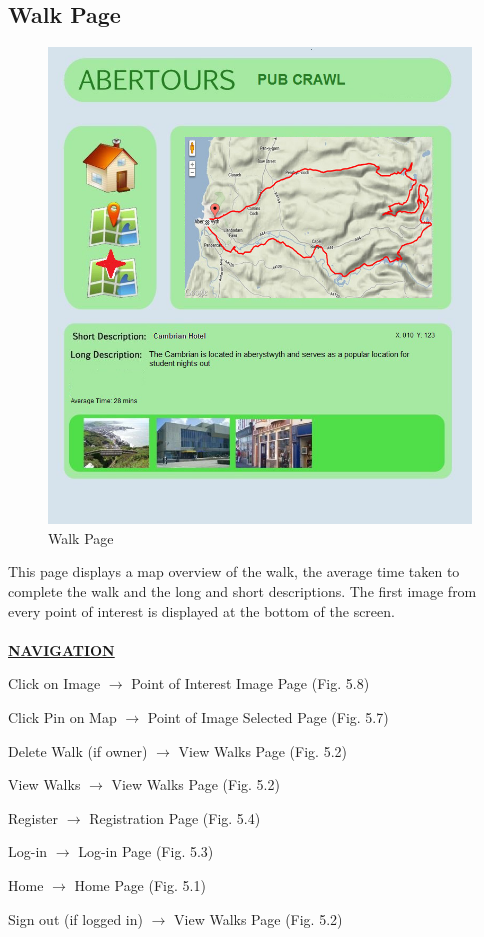 \documentclass[12pt]{article}
\begin{document}
\subsection{Walk Page}
\begin{figure}[htp]
\centering
\includegraphics[scale=0.50]{Project_Plan/Web/poi_selected_page_01_copy.jpg}
\caption{Walk Page }
\label{Walk Page}
\end{figure}
\par{This page displays a map overview of the walk, the average time taken to complete the walk and the long and short descriptions. The first image from every point of interest is displayed at the bottom of the screen. \\ \\}
\textbf{\uline{NAVIGATION}}
\par{Click on Image $\rightarrow$ Point of Interest Image Page (Fig. 5.8)}
\par{Click Pin on Map $\rightarrow$ Point of Image Selected Page (Fig. 5.7)}
\par{Delete Walk (if owner) $\rightarrow$ View Walks Page (Fig. 5.2)}
\par{View Walks $\rightarrow$ View Walks Page (Fig. 5.2)}
\par{Register $\rightarrow$ Registration Page (Fig. 5.4)}
\par{Log-in $\rightarrow$ Log-in Page (Fig. 5.3)}
\par{Home $\rightarrow$ Home Page (Fig. 5.1)}
\par{Sign out (if logged in) $\rightarrow$ View Walks Page (Fig. 5.2)}
\end{document}
